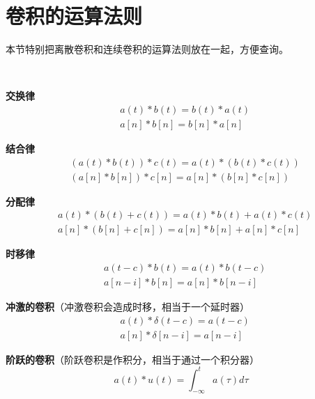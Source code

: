 \section{卷积的运算法则}

本节特别把离散卷积和连续卷积的运算法则放在一起，方便查询。

~

{\bf 交换律}
\begin{align*}
&a\left( t \right) \ast b\left( t \right) =b\left( t \right) \ast a\left( t \right) \\
&a\left[ n \right] \ast b\left[ n \right] =b\left[ n \right] \ast a\left[ n \right]
\end{align*}

{\bf 结合律}
\begin{align*}
&\left( a\left( t \right) \ast b\left( t \right) \right) \ast c\left( t \right) =a\left( t \right) \ast \left( b\left( t \right) \ast c\left( t \right) \right) \\
&\left( a\left[ n \right] \ast b\left[ n \right] \right) \ast c\left[ n \right] =a\left[ n \right] \ast \left( b\left[ n \right] \ast c\left[ n \right] \right)
\end{align*}

{\bf 分配律}
\begin{align*}
&a\left( t \right) \ast \left( b\left( t \right) +c\left( t \right) \right) =a\left( t \right) \ast b\left( t \right) +a\left( t \right) \ast c\left( t \right) \\
&a\left[ n \right] \ast \left( b\left[ n \right] +c\left[ n \right] \right) =a\left[ n \right] \ast b\left[ n \right] +a\left[ n \right] \ast c\left[ n \right]
\end{align*}

{\bf 时移律}
\begin{align*}
&a\left( t-c \right) \ast b\left( t \right) =a\left( t \right) \ast b\left( t-c \right) \\
&a\left[ n-i \right] \ast b\left[ n \right] =a\left[ n \right] \ast b\left[ n-i \right]
\end{align*}

{\bf 冲激的卷积}（冲激卷积会造成时移，相当于一个延时器）
\begin{align*}
&a\left( t \right) \ast \delta \left( t-c \right) =a\left( t-c \right) \\
&a\left[ n \right] \ast \delta \left[ n-i \right] =a\left[ n-i \right]
\end{align*}

{\bf 阶跃的卷积}（阶跃卷积是作积分，相当于通过一个积分器）
\[
a\left( t \right) \ast u\left( t \right) =\int_{-\infty}^t{a\left( \tau \right) d\tau}
\]

